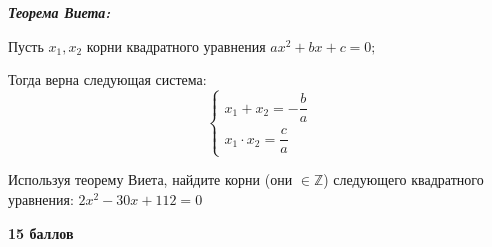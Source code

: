  \textbf{\textit{Теорема Виета:}}

Пусть $x_1,x_2$ корни квадратного уравнения $ax^2+bx+c=0;$

Тогда верна следующая система:
\begin{equation*}
 \begin{cases}
   x_1+x_2=-\dfrac{b}{a}
   \\
   x_1\cdot x_2=\dfrac{c}{a}
 \end{cases}
\end{equation*}

Используя теорему Виета, найдите корни (они $\in \mathbb{Z}$) следующего квадратного уравнения: $2x^{2}-30x+112=0$
\begin{flushright} \textbf{15 баллов}\\ 
\end{flushright}


